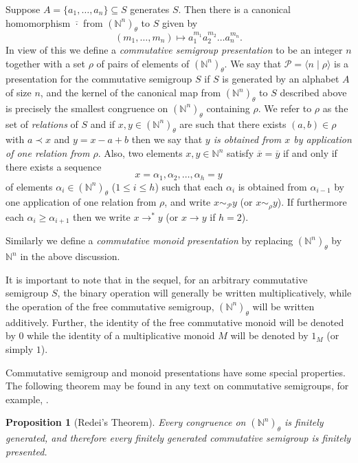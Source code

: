 \documentclass[12pt]{article}
\def\N{{\mathbb{N}}}
\newtheorem{proposition}{\qquad\bf Proposition}
\begin{document}
Suppose $A = \{a_1, \ldots, a_n\} \subseteq S$ generates 
$S$. Then there is a canonical homomorphism $\overline{\cdot}$
from $(\N^n)_\theta$ to $S$ given by 
$$(m_1, \ldots, m_n) \mapsto a_1^{m_1} a_2^{m_2} \ldots a_n^{m_n}.$$
In view of this we define a {\em commutative semigroup presentation} to
be an integer $n$ together with a set $\rho$ of pairs of elements 
of $(\N^n)_\theta$. We say that $\mathcal{P}=\langle n  \mid \rho \rangle$
is a presentation for the commutative semigroup $S$ if $S$ is generated
by an alphabet  $A$ of size $n$, and the kernel of the canonical map
from $(\N^n)_\theta$ to $S$ described above is precisely the smallest
congruence on $(\N^n)_\theta$ containing $\rho$.
We refer to $\rho$ as the set of \emph{relations} of $S$ and if
$x,y\in (\mathbb{N}^n)_{\theta}$ are such that there exists $(a,b)\in \rho$
with $a \prec x$ and  $y=x-a+b$ then we say that \emph{$y$ is obtained
from $x$ by application of one relation from $\rho$}.
Also, two elements $x,y\in\mathbb{N}^n$ satisfy $\overline{x}=
\overline{y}$ if and only if there exists a sequence 
$$x=\alpha_1,\alpha_2,\ldots,\alpha_h=y$$
of elements $\alpha_i\in(\mathbb{N}^n)_{\theta}$ ($1\leq i\leq h$)
such that each $\alpha_i$ is obtained from $\alpha_{i-1}$ by
one application of one relation from $\rho$,
and write $x\sim_{\mathcal{P}}y$ (or $x\sim_{\rho}y$).
If furthermore each $\alpha_{i}\geq\alpha_{i+1}$  
then we write $x\rightarrow^*y$ (or $x\rightarrow y$ if $h=2$).

Similarly we define a \emph{commutative monoid presentation}
by replacing $(\mathbb{N}^n)_{\theta}$ by $\mathbb{N}^n$ in
the above discussion. 

It is important to note that in the sequel, for an arbitrary 
commutative semigroup $S$, the binary operation will generally 
be written multiplicatively, while the operation of the free 
commutative semigroup, $(\mathbb{N}^n)_\theta$ will be written 
additively. Further, the identity of the free commutative monoid 
will be denoted by $0$ while the identity of a multiplicative 
monoid $M$ will be denoted by $1_M$ (or simply $1$).

Commutative semigroup and monoid presentations have some special 
properties. The following theorem may be found in any text on 
commutative semigroups, for example, \cite{bRG99}.

\begin{proposition}[Redei's Theorem]\label{Redei}
Every congruence on $(\N^n)_\theta$ is finitely generated, 
and therefore every finitely generated commutative 
semigroup is finitely presented.
\end{proposition}
\end{document}
